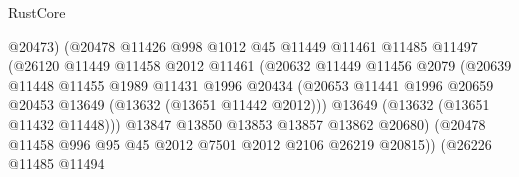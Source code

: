 \begin{lexlean}{RustCore}
\begin{coremodule}
                                    @20473)
                                  (@20478
                                    @11426
                                    @998
                                    @1012
                                    @45
                                    @11449
                                    @11461
                                    @11485
                                    @11497
                                    (@26120
                                      @11449
                                      @11458
                                      @2012
                                      @11461
                                      (@20632
                                        @11449
                                        @11456
                                        @2079
                                        (@20639
                                          @11448
                                          @11455
                                          @1989
                                          @11431
                                          @1996
                                          @20434
                                          (@20653
                                            @11441
                                            @1996
                                            @20659
                                            @20453
                                            @13649
                                            (@13632 (@13651 @11442 @2012)))
                                          @13649
                                          (@13632 (@13651 @11432 @11448)))
                                        @13847
                                        @13850
                                        @13853
                                        @13857
                                        @13862
                                        @20680)
                                      (@20478
                                        @11458
                                        @996
                                        @95
                                        @45
                                        @2012
                                        @7501
                                        @2012
                                        @2106
                                        @26219
                                        @20815))
                                    (@26226
                                      @11485
                                      @11494

\end{coremodule}
\end{lexlean}
